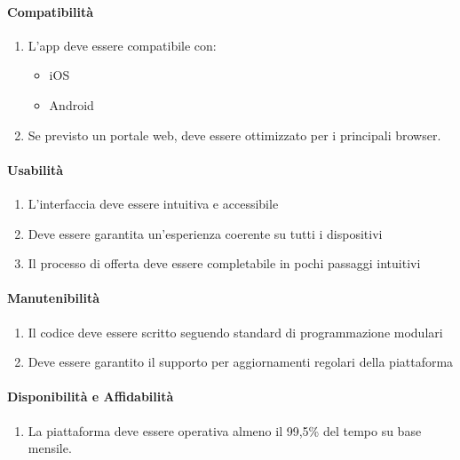 \paragraph{Compatibilità}

\begin{enumerate}
    \item L'app deve essere compatibile con:
    \begin{itemize}
        \item iOS
        \item Android
    \end{itemize}
    \item Se previsto un portale web, deve essere ottimizzato per i principali browser.
\end{enumerate}

\paragraph{Usabilità}

\begin{enumerate}
    \item L'interfaccia deve essere intuitiva e accessibile
    \item Deve essere garantita un'esperienza coerente su tutti i dispositivi
    \item Il processo di offerta deve essere completabile in pochi passaggi intuitivi
\end{enumerate}

\paragraph{Manutenibilità}

\begin{enumerate}
    \item Il codice deve essere scritto seguendo standard di programmazione modulari
    \item Deve essere garantito il supporto per aggiornamenti regolari della piattaforma
\end{enumerate}

\paragraph{Disponibilità e Affidabilità}

\begin{enumerate}
    \item La piattaforma deve essere operativa almeno il 99,5\% del tempo su base mensile.
\end{enumerate}

